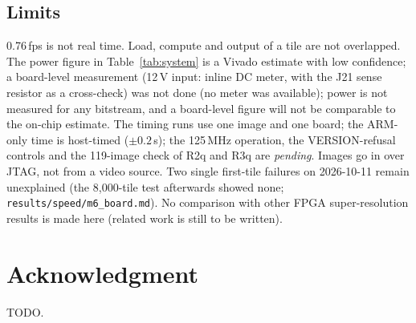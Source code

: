 \documentclass[conference]{IEEEtran}
\begin{document}
\subsection{Limits}
0.76\,fps is not real time. Load, compute and output of a tile are not overlapped. The power figure in Table~\ref{tab:system} is a Vivado estimate with low confidence; a board-level measurement (12\,V input: inline DC meter, with the J21 sense resistor as a cross-check) was not done (no meter was available); power is not measured for any bitstream, and a board-level figure will not be comparable to the on-chip estimate.
The timing runs use one image and one board; the ARM-only time is host-timed ($\pm0.2$\,s); the 125\,MHz operation, the VERSION-refusal controls and the 119-image check of R2q and R3q are \emph{pending}.
Images go in over JTAG, not from a video source. Two single first-tile failures on 2026-10-11 remain unexplained (the 8{,}000-tile test afterwards showed none; \texttt{results/\allowbreak{}speed/\allowbreak{}m6\_board.md}).
No comparison with other FPGA super-resolution results is made here (related work is still to be written).

\section*{Acknowledgment}
TODO.



\end{document}

